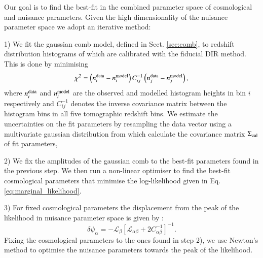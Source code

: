 \documentclass{aa}
\newcommand{\eq}[1]{\begin{equation}  #1 \end{equation}}
\begin{document}
Our goal is to find the best-fit in the combined parameter space of cosmological and nuisance parameters. Given the high dimensionality of the nuisance parameter space we adopt an iterative method:

1) We fit the gaussian comb model, defined in Sect. \ref{sec:comb}, to redshift distribution histograms of \cite{hildebrandt18} which are calibrated with the fiducial DIR method. This is done by minimising 
\eq{
\chi^2 = \left(n^{\rm data}_i - n^{\rm model}_i\right) C^{-1}_{ij} \left(n^{\rm data}_j - n^{\rm model}_j\right),
} 
where $n^{\rm data}_i$ and $n^{\rm model}_i$ are the observed and modelled histogram heights in bin $i$ respectively and $C^{-1}_{ij}$ denotes the inverse covariance matrix between the histogram bins in all five tomographic redshift bins. We estimate the uncertainties on the fit parameters by resampling the data vector using a multivariate gaussian distribution from which calculate the covariance matrix $\Sigma_{\rm cal}$ of fit parameters,

2) We fix the amplitudes of the gaussian comb to the best-fit parameters found in the previous step. We then run a non-linear optimiser to find the best-fit cosmological parameters that minimise the log-likelihood given in Eq. \ref{eq:marginal_likelihood}.

3) For fixed cosmological parameters the displacement from the peak of the likelihood in nuisance parameter space is given by \citep{taylor10}:
\begin{equation}
\delta\psi_\alpha = -\mathcal{L}_\beta\left[\mathcal{L}_{\alpha\beta}+2C_{\alpha\beta}^{-1}\right]^{-1}. 
\end{equation}
Fixing the cosmological parameters to the ones found in step 2), we use Newton's method to optimise the nuisance parameters towards the peak of the likelihood.
\end{document}
